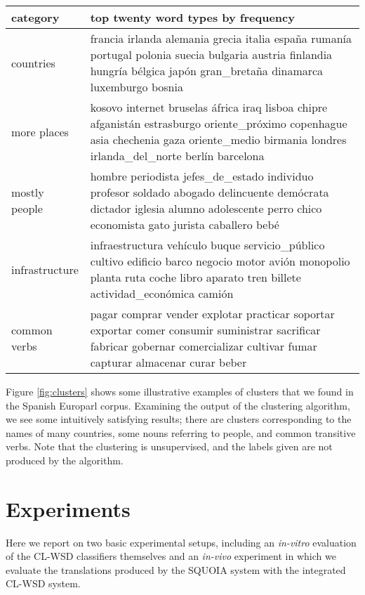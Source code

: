 \documentclass[10pt, a4paper]{article}
\begin{document}
\begin{figure*}[t!]
  \begin{tabular}{|l|p{15cm}|}
    \hline
    category  & top twenty word types by frequency \\
    \hline
    countries & francia irlanda alemania grecia italia españa rumanía portugal polonia suecia bulgaria austria finlandia hungría bélgica japón gran\_bretaña dinamarca luxemburgo bosnia \\
    \hline
    more places & kosovo internet bruselas áfrica iraq lisboa chipre afganistán estrasburgo oriente\_próximo copenhague asia chechenia gaza oriente\_medio birmania londres irlanda\_del\_norte berlín barcelona \\
    \hline
    mostly people & hombre periodista jefes\_de\_estado individuo profesor soldado abogado delincuente demócrata dictador iglesia alumno adolescente perro chico economista gato jurista caballero bebé \\
    \hline
    infrastructure & infraestructura vehículo buque servicio\_público cultivo edificio barco negocio motor avión monopolio planta ruta coche libro aparato tren billete actividad\_económica camión \\
    \hline
    common verbs & pagar comprar vender explotar practicar soportar exportar comer consumir suministrar sacrificar fabricar gobernar comercializar cultivar fumar capturar almacenar curar beber \\
    \hline
  \end{tabular}
\caption{Some illustrative clusters found by the Brown clustering algorithm on
the Spanish Europarl data. These are five out of $C=1000$ clusters, and
were picked and labeled arbitrarily by the authors. The words listed are the
top twenty terms from that cluster, by frequency.}
\label{fig:clusters}
\end{figure*}

Figure \ref{fig:clusters} shows some illustrative examples of clusters that
we found in the Spanish Europarl corpus.  Examining the output of the
clustering algorithm, we see some intuitively satisfying results; there are
clusters corresponding to the names of many countries, some nouns referring to
people, and common transitive verbs. Note that the clustering is unsupervised,
and the labels given are not produced by the algorithm.

\section{Experiments}
Here we report on two basic experimental setups, including an \emph{in-vitro}
evaluation of the CL-WSD classifiers themselves and an \emph{in-vivo}
experiment in which we evaluate the translations produced by the SQUOIA system
with the integrated CL-WSD system.
\end{document}
